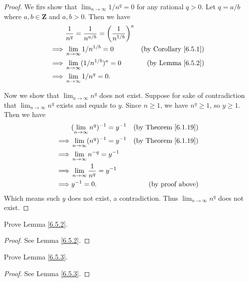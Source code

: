 \begin{proof}
We firs show that \(\lim_{n \to \infty} 1 / n^q = 0\) for any rational \(q > 0\).
Let \(q = a / b\) where \(a, b \in \mathbf{Z}\) and \(a, b > 0\).
Then we have
\begin{align*}
& \frac{1}{n^q} = \frac{1}{n^{a / b}} = \bigg(\frac{1}{n^{1 / b}}\bigg)^a \\
\implies & \lim_{n \to \infty} 1 / n^{1 / b} = 0 & \text{(by Corollary \ref{6.5.1})} \\
\implies & \lim_{n \to \infty} (1 / n^{1 / b})^a = 0 & \text{(by Lemma \ref{6.5.2})} \\
\implies & \lim_{n \to \infty} 1 / n^q = 0.
\end{align*}

Now we show that \(\lim_{n \to \infty} n^q\) does not exist.
Suppose for sake of contradiction that \(\lim_{n \to \infty} n^q\) exists and equals to \(y\).
Since \(n \geq 1\), we have \(n^q \geq 1\), so \(y \geq 1\).
Then we have
\begin{align*}
& (\lim_{n \to \infty} n^q)^{-1} = y^{-1} & \text{(by Theorem \ref{6.1.19})} \\
\implies & \lim_{n \to \infty} (n^q)^{-1} = y^{-1} & \text{(by Theorem \ref{6.1.19})} \\
\implies & \lim_{n \to \infty} n^{-q} = y^{-1} \\
\implies & \lim_{n \to \infty} \frac{1}{n^q} = y^{-1} \\
\implies & y^{-1} = 0. & \text{(by proof above)}
\end{align*}
Which means such \(y\) does not exist, a contradiction.
Thus \(\lim_{n \to \infty} n^q\) does not exist.
\end{proof}

\begin{exercise}\label{ex 6.5.2}
Prove Lemma \ref{6.5.2}.
\end{exercise}

\begin{proof}
See Lemma \ref{6.5.2}.
\end{proof}

\begin{exercise}\label{ex 6.5.3}
Prove Lemma \ref{6.5.3}.
\end{exercise}

\begin{proof}
See Lemma \ref{6.5.3}.
\end{proof}